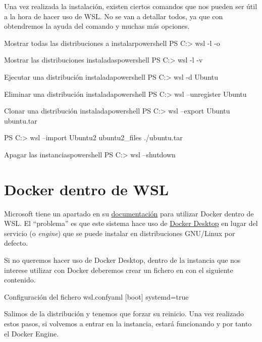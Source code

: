 Una vez realizada la instalación, existen ciertos comandos que nos pueden ser útil a la hora de hacer uso de WSL. No se van a detallar todos, ya que con  obtendremos la ayuda del comando y muchas más opciones.


\begin{mycode}{Mostrar todas las distribuciones a instalar}{powershell}{}
PS C:\Users\ruben> wsl -l -o
\end{mycode}

\begin{mycode}{Mostrar las distribuciones instaladas}{powershell}{}
PS C:\Users\ruben> wsl -l -v
\end{mycode}

\begin{mycode}{Ejecutar una distribución instalada}{powershell}{}
PS C:\Users\ruben> wsl -d Ubuntu
\end{mycode}

\begin{mycode}{Eliminar una distribución instalada}{powershell}{}
PS C:\Users\ruben> wsl --unregister Ubuntu
\end{mycode}


\begin{mycode}{Clonar una distribución instalada}{powershell}{}
PS C:\Users\ruben> wsl --export Ubuntu ubuntu.tar

PS C:\Users\ruben> wsl --import Ubuntu2 ubuntu2_files ./ubuntu.tar
\end{mycode}

\begin{mycode}{Apagar las instancias}{powershell}{}
PS C:\Users\ruben> wsl --shutdown
\end{mycode}


\chapter{Docker dentro de WSL}

Microsoft tiene un apartado en su \href{https://learn.microsoft.com/es-es/windows/wsl/tutorials/wsl-containers}{documentación} para utilizar Docker dentro de WSL. El “problema” es que este sistema hace uso de \href{https://www.docker.com/products/docker-desktop/}{Docker Desktop} en lugar del servicio (o \textit{engine}) que se puede instalar en distribuciones GNU/Linux por defecto.

Si no queremos hacer uso de Docker Desktop, dentro de la instancia que nos interese utilizar con Docker deberemos crear un fichero en  con el siguiente contenido.

\begin{mycode}{Configuración del fichero wsl.conf}{yaml}{}
[boot]
systemd=true
\end{mycode}

Salimos de la distribución y tenemos que forzar su reinicio. Una vez realizado estos pasos, si volvemos a entrar en la instancia,  estará funcionando y por tanto el Docker Engine.